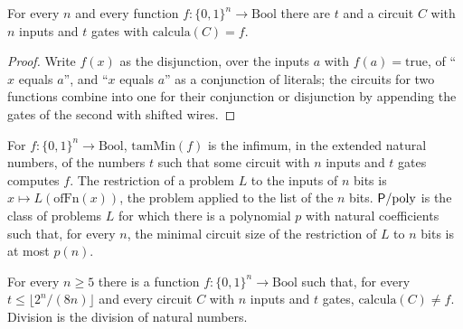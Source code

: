 \begin{theorem}
  \label{thm:machines-every-function}
  \leanok
  For every $n$ and every function $f : \{0,1\}^n \to \mathrm{Bool}$ there are $t$ and a circuit $C$ with $n$ inputs
  and $t$ gates with $\mathrm{calcula}(C) = f$.
\end{theorem}

\begin{proof}
  \leanok
  Write $f(x)$ as the disjunction, over the inputs $a$ with $f(a) = \mathrm{true}$, of ``$x$ equals $a$'', and
  ``$x$ equals $a$'' as a conjunction of literals; the circuits for two functions combine into one for their
  conjunction or disjunction by appending the gates of the second with shifted wires.
\end{proof}

\begin{definition}
  \label{def:machines-ppoly}
  \leanok
  For $f : \{0,1\}^n \to \mathrm{Bool}$, $\mathrm{tamMin}(f)$ is the infimum, in the extended natural numbers, of
  the numbers $t$ such that some circuit with $n$ inputs and $t$ gates computes $f$. The restriction of a
  problem $L$ to the inputs of $n$ bits is $x \mapsto L(\mathrm{ofFn}(x))$, the problem applied to the list of
  the $n$ bits. $\mathsf{P}/\mathrm{poly}$ is the class of problems $L$ for which there is a polynomial $p$ with natural
  coefficients such that, for every $n$, the minimal circuit size of the restriction of $L$ to $n$ bits is
  at most $p(n)$.
\end{definition}

\begin{theorem}
  \label{thm:machines-shannon}
  \leanok
  For every $n \ge 5$ there is a function $f : \{0,1\}^n \to \mathrm{Bool}$ such that, for every
  $t \le \lfloor 2^n / (8n) \rfloor$ and every circuit $C$ with $n$ inputs and $t$ gates,
  $\mathrm{calcula}(C) \ne f$. Division is the division of natural numbers.
\end{theorem}


